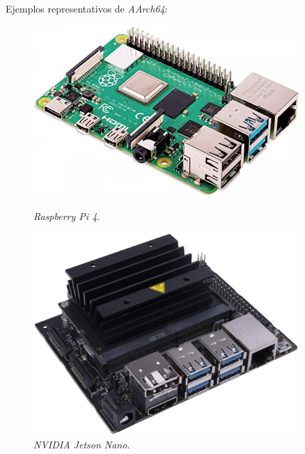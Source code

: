 Ejemplos representativos de \textit{AArch64}:
\begin{figure} [h!]
	\begin{center}
		\begin{minipage}{0.45\textwidth}
			\begin{center}
				\includegraphics[width=0.9\textwidth]{figs/raspberrypi}
			\end{center}
			\caption{\textit{Raspberry Pi 4}.}
		\end{minipage}\hfill
		\begin{minipage}{0.45\textwidth}
			\begin{center}
				\includegraphics[width=0.9\textwidth]{figs/jetsonnano}
			\end{center}
			\caption{\textit{NVIDIA Jetson Nano}.}
		\end{minipage}
	\end{center}
	\label{fig:aarch64}
\end{figure}\

